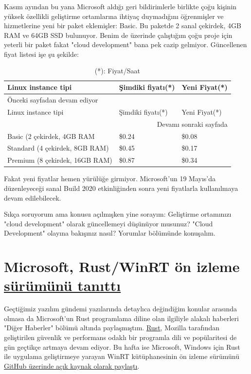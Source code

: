 \documentclass[11pt]{article}
\begin{document}
Kasım ayından bu yana Microsoft aldığı geri bildirimlerle birlikte çoğu
kişinin yüksek özellikli geliştirme ortamlarına ihtiyaç duymadığını
öğrenmişler ve hizmetlerine yeni bir paket eklemişler: Basic. Bu paketde 2
sanal çekirdek, 4GB RAM ve 64GB SSD bulunuyor. Benim de üzerinde çalıştığım
çoğu proje için yeterli bir paket fakat "cloud development" bana pek cazip
gelmiyor. Güncellenen fiyat listesi işe şu şekilde:

\begin{longtable}{|p{5cm}|p{3cm}|p{3cm}|}
\caption{(*): Fiyat/Saat}
\\
\hline
Linux instance tipi & Şimdiki fiyatı(*) & Yeni Fiyat(*)\\
\hline
\endfirsthead
\multicolumn{3}{l}{Önceki sayfadan devam ediyor} \\
\hline

Linux instance tipi & Şimdiki fiyatı(*) & Yeni Fiyat(*) \\

\hline
\endhead
\hline\multicolumn{3}{r}{Devamı sonraki sayfada} \\
\endfoot
\endlastfoot
\hline
Basic (2 çekirdek, 4GB RAM & \$0.24 & \$0.08\\
Standard (4 çekirdek, 8GB RAM) & \$0.45 & \$0.17\\
Premium (8 çekirdek, 16GB RAM) & \$0.87 & \$0.34\\
\hline
\end{longtable}
Fakat yeni fiyatlar hemen yürülüğe girmiyor. Microsoft'un 19 Mayıs'da
düzenleyeceği sanal Build 2020 etkinliğinden sonra yeni fiyatlarla
kullanılmaya devam edilebilecek.

Sıkça soruyorum ama konusu açılmışken yine sorayım: Geliştirme ortamınızı
"cloud development" olarak güncellemeyi düşünüyor musunuz? "Cloud Development"
olayına bakışınız nasıl? Yorumlar bölümünde konuşalım.
\section{Microsoft, Rust/WinRT ön izleme \href{https://blogs.windows.com/windowsdeveloper/2020/04/30/rust-winrt-public-preview/}{sürümünü tanıttı}}
\label{sec:orgacfa055}
Geçtiğimiz yazılım gündemi yazılarında detaylıca değindiğim konular arasında
olmasa da Microsoft'un Rust programlama diline olan ilgiliyle alakalı
haberleri "Diğer Haberler" bölümü altında paylaşmıştım. \href{https://www.rust-lang.org/tr/}{Rust}, Mozilla
tarafından geliştirilen güvenlik ve performans odaklı bir programla dili ve
popülaritesi de gün geçtikçe artmaya devam ediyor. Bu hafta ise Microsoft,
Windows için Rust ile uygulama geliştirmeye yarayan WinRT kütüphanesinin ön
izleme sürümünü \href{https://github.com/microsoft/winrt-rs}{GitHub üzerinde açık kaynak olarak paylaştı}.
\end{document}

